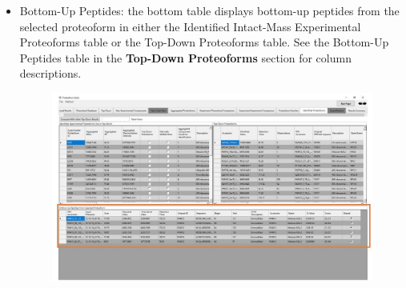 \begin{itemize}
\begin{figure}[h]
\end{figure}
\item Bottom-Up Peptides: the bottom table displays bottom-up peptides from the selected proteoform in either the Identified Intact-Mass Experimental Proteoforms table or the Top-Down Proteoforms table. See the Bottom-Up Peptides table in the \textbf{Top-Down Proteoforms} section for column descriptions.
	\begin{figure}[h]
\centering
\includegraphics[scale=0.45]{figures/identified3.jpg}
\end{figure}
\end{itemize}